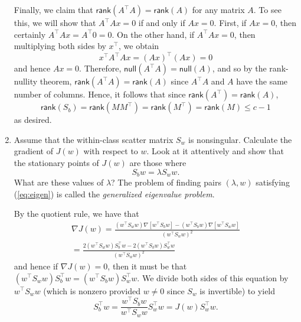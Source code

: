 \documentclass{../kin_math}
\begin{document}
\begin{questions}
\begin{enumerate}[label=\arabic*.]
\begin{solution}
      Finally, we claim that $\textsf{rank}(A^\top A) = \textsf{rank}(A)$ for any matrix $A$. To see this, we will show that $A^\top A x = 0$ if and only if $A x = 0$. First, if $Ax = 0$, then certainly $A^\top Ax = A^\top 0 = 0$. On the other hand, if $A^\top A x = 0$, then multiplying both sides by $x^\top$, we obtain
      \begin{equation*}
        x^\top A^\top A x = (Ax)^\top (Ax) = 0
      \end{equation*}
      and hence $Ax = 0$. Therefore, $\textsf{null}(A^\top A) = \textsf{null}(A)$, and so by the rank-nullity theorem, $\textsf{rank}(A^\top A) = \textsf{rank}(A)$ since $A^\top A$ and $A$ have the same number of columns. Hence, it follows that since $\textsf{rank}(A^\top) = \textsf{rank}(A)$,
      \begin{equation*}
        \textsf{rank}(S_b) = \textsf{rank}(MM^\top) = \textsf{rank}(M^\top) = \textsf{rank}(M) \leq c - 1
      \end{equation*}
      as desired.
    \end{solution}
    \item Assume that the within-class scatter matrix $S_w$ is nonsingular. Calculate the gradient of $J(w)$ with respect to $w$. Look at it attentively and show that the stationary points of $J(w)$ are those where
    \begin{equation}
      \label{eq:eigen}
      S_b w = \lambda S_w w.
    \end{equation}
    What are these values of $\lambda$? The problem of finding pairs $(\lambda, w)$ satisfying (\ref{eq:eigen}) is called the \emph{generalized eigenvalue problem}.
    \begin{solution}
      By the quotient rule, we have that
      \begin{multline*}
        \nabla J(w) = \frac{(w^\top S_w w) \nabla [w^\top S_b w] - (w^\top S_b w) \nabla [w^\top S_w w]}{(w^\top S_w w)^2} \\
        = \frac{2 (w^\top S_w w) S_b^\top w - 2 (w^\top S_b w) S_w^\top w}{(w^\top S_w w)^2}
      \end{multline*}
      and hence if $\nabla J(w) = 0$, then it must be that $(w^\top S_w w) S_b^\top w = (w^\top S_b w) S_w^\top w$. We divide both sides of this equation by $w^\top S_w w$ (which is nonzero provided $w \neq 0$ since $S_w$ is invertible) to yield
      \begin{equation*}
        S_b^\top w = \frac{w^\top S_b w}{w^\top S_w w} S_w^\top w = J(w) S_w^\top w.
      \end{equation*}

\end{solution}
\end{enumerate}
\end{questions}
\end{document}

